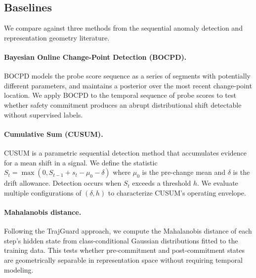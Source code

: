 \subsection{Baselines}
\label{sec:baselines}

We compare against three methods from the sequential anomaly detection and representation geometry literature.

\paragraph{Bayesian Online Change-Point Detection (BOCPD).} BOCPD models the probe score sequence as a series of segments with potentially different parameters, and maintains a posterior over the most recent change-point location. We apply BOCPD to the temporal sequence of probe scores to test whether safety commitment produces an abrupt distributional shift detectable without supervised labels.

\paragraph{Cumulative Sum (CUSUM).} CUSUM is a parametric sequential detection method that accumulates evidence for a mean shift in a signal. We define the statistic $S_t = \max(0, S_{t-1} + s_t - \mu_0 - \delta)$ where $\mu_0$ is the pre-change mean and $\delta$ is the drift allowance. Detection occurs when $S_t$ exceeds a threshold $h$. We evaluate multiple configurations of $(\delta, h)$ to characterize CUSUM's operating envelope.

\paragraph{Mahalanobis distance.} Following the TrajGuard approach, we compute the Mahalanobis distance of each step's hidden state from class-conditional Gaussian distributions fitted to the training data. This tests whether pre-commitment and post-commitment states are geometrically separable in representation space without requiring temporal modeling.

